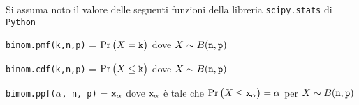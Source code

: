 \documentclass[11pt,twoside,a4paper]{article}
\begin{document}
\vfill
\hrulefill

Si assuma noto il valore delle seguenti funzioni della libreria {\tt scipy.stats\/} di  {\tt Python\/}

{\tt binom.pmf(k,n,p)} = $\Pr\big(X={\tt k}\big)$ dove $X\sim B({\tt n},{\tt p})$ 

{\tt binom.cdf(k,n,p)} = $\Pr\big(X\le{\tt k}\big)$ dove  $X\sim B({\tt n},{\tt p})$ 

{\tt bimom.ppf($\alpha$, n, p)} = ${\tt x_\alpha}$ dove ${\tt x_\alpha}$ è tale che $\Pr\big(X\le{\tt x_\alpha}\big)=\alpha$ per $X\sim B({\tt n},{\tt p})$ 
\end{document}
